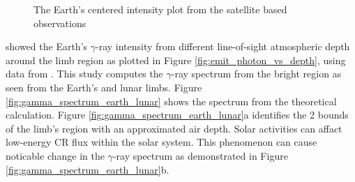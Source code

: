 \begin{figure}[h!]
    \centering
        \hfill
        \caption{
            The Earth's centered intensity plot from the satellite based observations
        }
       \label{fig:gamma_earth_second_wave}
\end{figure}

\cite{Morris84} showed the Earth's $\gamma$-ray intensity from different
line-of-sight atmospheric depth around the limb region
as plotted in Figure \ref{fig:emit_photon_vs_depth}, using data from \cite{Thompson81}.
This study computes the $\gamma$-ray spectrum from 
the bright region as seen from the Earth's and lunar limbs.
Figure \ref{fig:gamma_spectrum_earth_lunar} 
shows the spectrum from the theoretical calculation.
Figure \ref{fig:gamma_spectrum_earth_lunar}a
identifies the 2 bounds of the limb's region with an approximated air depth.
Solar activities can affact low-energy CR flux within the solar system.
This phenomenon can cause noticable change in the $\gamma$-ray
spectrum as demonstrated in Figure \ref{fig:gamma_spectrum_earth_lunar}b.

